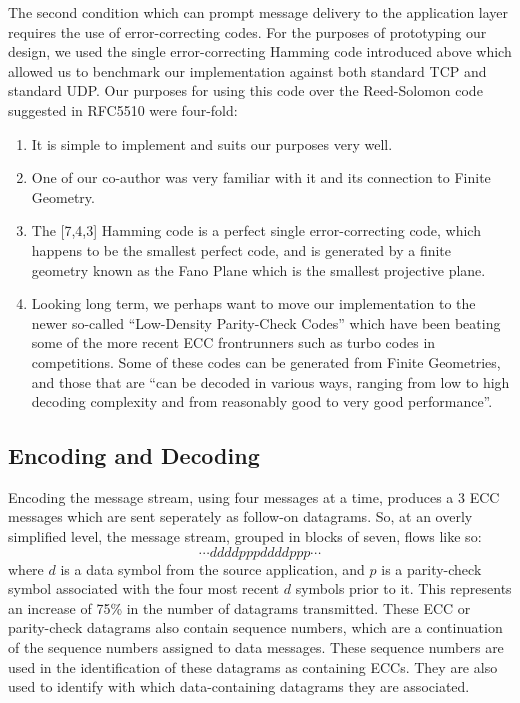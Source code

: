 \documentclass[conference]{IEEEtran}
\theoremstyle{definition}
\begin{document}
The second condition which can prompt message delivery to
the application layer requires the use of
error-correcting codes.  For the purposes of prototyping
our design, we used the single error-correcting Hamming
code introduced above which allowed us to benchmark
our implementation against both standard TCP and
standard UDP.  Our purposes for using this code over
the Reed-Solomon code suggested in RFC5510\cite{lacan2009reed}
were four-fold:

\begin{enumerate}
 \item It is simple to implement and suits our purposes very well.
 \item One of our co-author was very familiar with it
       and its connection to Finite Geometry.
 \item The [7,4,3] Hamming code is a perfect single error-correcting
       code, which happens to be the smallest perfect code,
       and is generated by a finite geometry known
       as the Fano Plane which is the smallest
       projective plane\cite{clanton2005maa}.
 \item Looking long term, we perhaps want to move
       our implementation to the newer so-called
       ``Low-Density Parity-Check Codes'' which
       have been beating some of the more recent ECC
       frontrunners such as turbo codes in competitions\cite{kou2001low}.
       Some of these codes can be generated from Finite
       Geometries, and those that are ``can be decoded in various
       ways, ranging from low to high decoding complexity and from
       reasonably good to very good performance''\cite{kou2001low}.
\end{enumerate}

\subsection{Encoding and Decoding}
Encoding the message stream, using four messages
at a time, produces a 3 ECC messages which are sent
seperately as follow-on datagrams.  So, at an overly simplified
level, the message stream, grouped in blocks of seven, flows like so:
$$ \cdots ddddpppddddppp\cdots $$ where $d$ is a data symbol
from the source application, and $p$ is a parity-check symbol
associated with the four most recent $d$ symbols prior to it.
This represents an increase of 75\% in the number of datagrams
transmitted. These ECC or parity-check datagrams also contain
sequence numbers, which are a continuation of the sequence
numbers assigned to data messages.  These sequence numbers
are used in the identification of these datagrams as containing
ECCs. They are also used to identify with which data-containing
datagrams they are associated.
\end{document}

